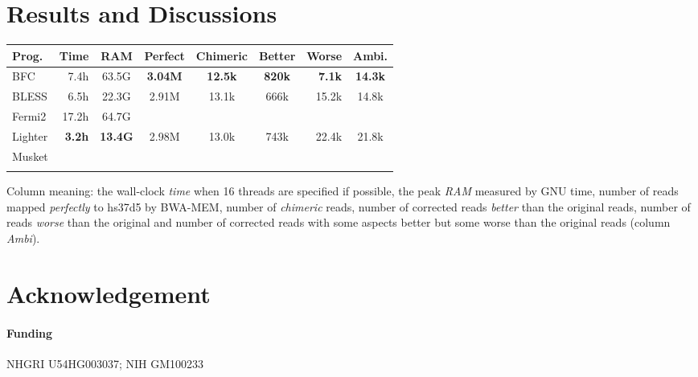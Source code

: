 \documentclass{bioinfo}
\begin{document}
\section{Results and Discussions}
\begin{table}[ht]
{\footnotesize
\begin{tabular}{lrccccrc}
\toprule
Prog.     & Time & RAM   & Perfect & Chimeric & Better & Worse & Ambi. \\
\midrule
BFC       & 7.4h & 63.5G & {\bf 3.04M} & {\bf 12.5k} & {\bf 820k}   & {\bf 7.1k}  & {\bf 14.3k} \\
BLESS     & 6.5h & 22.3G & 2.91M   & 13.1k    & 666k   & 15.2k & 14.8k \\
Fermi2    &17.2h & 64.7G & \\
Lighter   &{\bf 3.2h}&{\bf 13.4G}&2.98M&13.0k & 743k   & 22.4k & 21.8k \\
Musket    &\\
\botrule
\end{tabular}}{Column meaning: the wall-clock \emph{time} when 16 threads
are specified if possible, the peak \emph{RAM} measured by GNU time, number of
reads mapped \emph{perfectly} to hs37d5 by BWA-MEM, number of \emph{chimeric}
reads, number of corrected reads \emph{better} than the original reads, number
of reads \emph{worse} than the original and number of corrected reads with some
aspects better but some worse than the original reads (column \emph{Ambi}).}

\end{table}

\section*{Acknowledgement}
\paragraph{Funding\textcolon} NHGRI U54HG003037; NIH GM100233


\end{document}
